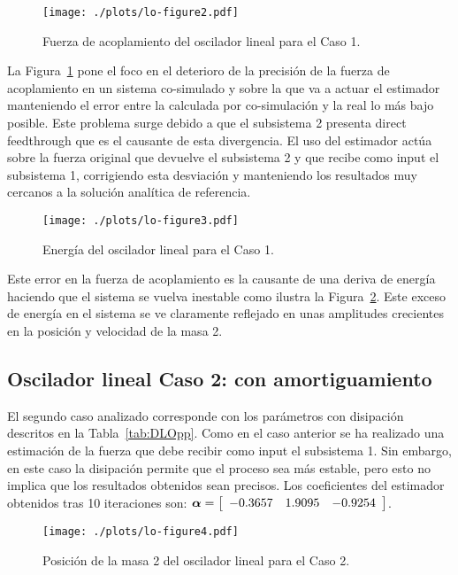 \begin{figure}[ht!]\centering
	\texttt{[image: ./plots/lo-figure2.pdf]}
	\caption{Fuerza de acoplamiento del oscilador lineal para el Caso 1.}
	\label{fig:OsciladorLinealFor1}
\end{figure}

La Figura~\ref{fig:OsciladorLinealFor1} pone el foco en el deterioro de la precisión de la fuerza de acoplamiento en un sistema co-simulado y sobre la que va a actuar el estimador manteniendo el error entre la calculada por co-simulación y la real lo más bajo posible.
Este problema surge debido a que el subsistema 2 presenta direct feedthrough que es el causante de esta divergencia.
El uso del estimador actúa sobre la fuerza original que devuelve el subsistema 2 y que recibe como input el subsistema 1, corrigiendo esta desviación y manteniendo los resultados muy cercanos a la solución analítica de referencia.

\begin{figure}[ht!]\centering
	\texttt{[image: ./plots/lo-figure3.pdf]}
	\caption{Energía del oscilador lineal para el Caso 1.}
	\label{fig:OsciladorLinealEnergia1}
\end{figure}

Este error en la fuerza de acoplamiento es la causante de una deriva de energía haciendo que el sistema se vuelva inestable como ilustra la Figura~\ref{fig:OsciladorLinealEnergia1}.
Este exceso de energía en el sistema se ve claramente reflejado en unas amplitudes crecientes en la posición y velocidad de la masa 2.


\subsection{Oscilador lineal Caso 2: con amortiguamiento}
\label{subsec:res_oscilador2}

El segundo caso analizado corresponde con los parámetros con disipación descritos en la Tabla~\ref{tab:DLOpp}.
Como en el caso anterior se ha realizado una estimación de la fuerza  que debe recibir como input el subsistema 1.
Sin embargo, en este caso la disipación permite que el proceso sea más estable, pero esto no implica que los resultados obtenidos sean precisos.
Los coeficientes del estimador obtenidos tras 10 iteraciones son:
$\coefficients = \sqbr{\matr{ccc}{-0.3657 & 1.9095 & -0.9254}}$.

\begin{figure}[ht!]\centering
	\texttt{[image: ./plots/lo-figure4.pdf]}
	\caption{Posición de la masa 2 del oscilador lineal para el Caso 2.}
	\label{fig:OsciladorLinealPos2}
\end{figure}

